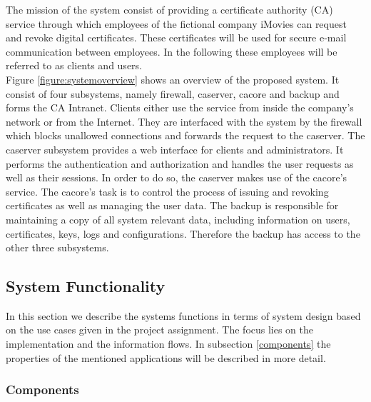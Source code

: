 \documentclass[english]{article}
\begin{document}
The mission of the system consist of providing a certificate authority (CA) service through which employees of the fictional company iMovies can request and revoke digital certificates. These certificates will be used for secure e-mail communication between employees. In the following these employees will be referred to as clients and users.\\
Figure {\ref{figure:systemoverview}} shows an overview of the proposed system. It consist of four subsystems, namely firewall, caserver, cacore and backup and forms the CA Intranet. Clients either use the service from inside the company's network or from the Internet. They are interfaced with the system by the firewall which blocks unallowed connections and forwards the request to the caserver. The caserver subsystem provides a web interface for clients and administrators. It performs the authentication and authorization and handles the user requests as well as their sessions. In order to do so, the caserver makes use of the cacore's service. The cacore's task is to control the process of issuing and revoking certificates as well as managing the user data. The backup is responsible for maintaining a copy of all system relevant data, including information on users, certificates, keys, logs and configurations. Therefore the backup has access to the other three subsystems.



\subsection{System Functionality} 
 In this section we describe the systems functions in terms of system design based on the use cases given in the project assignment. The focus lies on the implementation and the information flows. In subsection \ref{components} the properties of the mentioned applications will be described in more detail.
 
 \subsubsection{Components}
\end{document}
